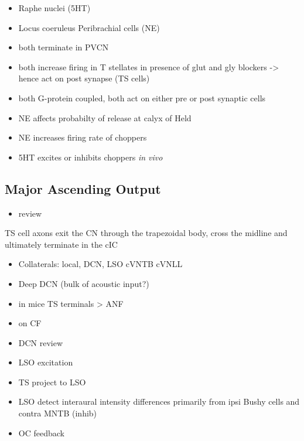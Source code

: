\begin{itemize}
\item Raphe nuclei (5HT)
\item Locus coeruleus Peribrachial cells (NE)
\item both terminate in PVCN \citep{KlepperHerbert:1991,Thompson:2003,ThompsonLauder:2005,Thompson:2003a,ThompsonWiechmann:2002,BehrensSchofieldEtAl:2002,ThompsonThompson:2001,ThompsonThompson:2001a,ThompsonMooreEtAl:1995,ThompsonThompsonEtAl:1994}
\item both increase firing in T stellates \citep{OertelWrightEtAl:2010} in presence of glut and gly blockers -> hence act on post synapse (TS cells)
\item both G-protein coupled, both act on either pre or post synaptic cells
\item NE affects probabilty of release at calyx of Held
\item NE increases firing rate of choppers \citep{KosslVater:1989,Ebert:1996}
\item 5HT excites or inhibits choppers \emph{in vivo} \citep{EbertOstwald:1992}
\end{itemize}

\subsection{Major Ascending Output}
\label{sec-1_6}


\begin{itemize}
\item review \citep{DoucetRyugo:2006}
\end{itemize}

TS cell axons exit the CN through the trapezoidal body, cross the midline and ultimately terminate in the cIC \citep{Adams:1979}


\begin{itemize}
\item Collaterals: local, DCN, LSO cVNTB cVNLL \citep{Warr:1969,SmithJorisEtAl:1993,Thompson:1998,DoucetRyugo:2003}
\item Deep DCN (bulk of acoustic input?)
\item in mice TS terminals > ANF \citep{CaoMcGinleyEtAl:2008}
\item on CF \citep{SmithRhode:1989,FriedlandPongstapornEtAl:2003,DoucetRyugo:1997}
\item DCN review \citep{OertelYoung:2004}
\item LSO excitation
\item TS project to LSO \citep{Thompson:1998,DoucetRyugo:2003,ThompsonThompson:1991a}
\item LSO detect interaural intensity differences primarily from ipsi Bushy cells and contra MNTB (inhib)
\item OC feedback
\end{itemize}

